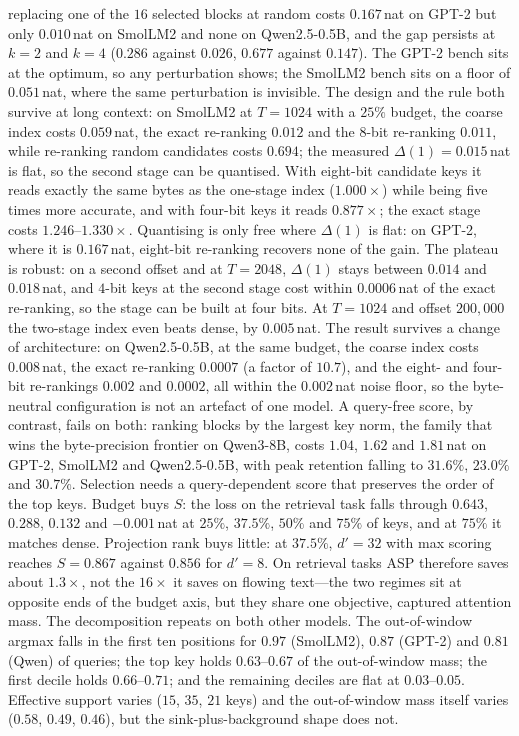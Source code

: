 \documentclass[sigconf,nonacm,11pt]{acmart}
\begin{document}
replacing one of the $16$ selected blocks at random costs $0.167$\,nat on GPT-2
but only $0.010$\,nat on SmolLM2 and none on Qwen2.5-0.5B, and the gap
persists at $k=2$ and $k=4$
($0.286$ against $0.026$, $0.677$ against $0.147$). The GPT-2 bench sits at the
optimum, so any perturbation shows; the SmolLM2 bench sits on a floor of
$0.051$\,nat, where the same perturbation is invisible. The design and the rule both survive at long context: on SmolLM2 at
$T=1024$ with a $25\%$ budget, the coarse index costs $0.059$\,nat, the exact
re-ranking $0.012$ and the $8$-bit re-ranking $0.011$, while re-ranking random
candidates costs $0.694$; the measured $\Delta(1)=0.015$\,nat is flat, so the second stage can be quantised. With eight-bit candidate keys it reads
exactly the same bytes as the one-stage index ($1.000\times$) while being five
times more accurate, and with four-bit keys it reads $0.877\times$; the exact
stage costs $1.246$--$1.330\times$. Quantising is only free where $\Delta(1)$ is
flat: on GPT-2, where it is $0.167$\,nat, eight-bit re-ranking recovers none of
the gain. The plateau is robust: on a second offset and at $T=2048$, $\Delta(1)$ stays
between $0.014$ and $0.018$\,nat, and $4$-bit keys at the second stage cost
within $0.0006$\,nat of the exact re-ranking, so the stage can be built at
four bits. At $T=1024$ and offset $200{,}000$ the two-stage index even beats
dense, by $0.005$\,nat. The result survives a change of architecture: on Qwen2.5-0.5B, at the same
budget, the coarse index costs $0.008$\,nat, the exact re-ranking $0.0007$ (a
factor of $10.7$), and the eight- and four-bit re-rankings $0.002$ and $0.0002$,
all within the $0.002$\,nat noise floor, so the byte-neutral configuration is not
an artefact of one model. A query-free
score, by contrast, fails on both: ranking blocks by the largest key norm, the
family that wins the byte-precision frontier on Qwen3-8B, costs $1.04$, $1.62$ and $1.81$\,nat on GPT-2, SmolLM2 and Qwen2.5-0.5B,
with peak retention falling to $31.6\%$, $23.0\%$ and $30.7\%$. Selection needs a query-dependent score that preserves the order of the
top keys. Budget buys $S$: the loss on the
retrieval task falls through $0.643$, $0.288$, $0.132$ and $-0.001$\,nat at $25\%$,
$37.5\%$, $50\%$ and $75\%$ of keys, and at $75\%$ it matches dense. Projection rank
buys little: at $37.5\%$, $d'=32$ with max scoring reaches $S=0.867$ against $0.856$
for $d'=8$. On retrieval tasks ASP therefore saves about $1.3\times$, not the
$16\times$ it saves on flowing text---the two regimes sit at opposite ends of the
budget axis, but they share one objective, captured attention mass.
The decomposition repeats on both other models. The out-of-window argmax falls in
the first ten positions for $0.97$ (SmolLM2), $0.87$ (GPT-2) and $0.81$ (Qwen) of
queries; the top key holds $0.63$--$0.67$ of the out-of-window mass; the first decile
holds $0.66$--$0.71$; and the remaining deciles are flat at $0.03$--$0.05$. Effective
support varies ($15$, $35$, $21$ keys) and the out-of-window mass itself varies
($0.58$, $0.49$, $0.46$), but the sink-plus-background shape does not.
\end{document}
